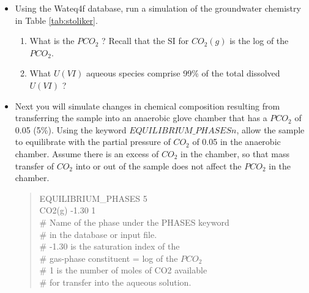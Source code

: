 \begin{itemize}
\item Using the Wateq4f database, run a simulation of the groundwater chemistry in Table \ref{tab:stoliker}.
\begin{enumerate}
\item What is the $PCO_2$ ? Recall that the SI for $CO_2(g)$ is the log of the $PCO_2$.
\item What $U(VI)$ aqueous species comprise 99\% of the total dissolved $U(VI)$ ?
\end{enumerate}

\item Next you will simulate changes in chemical composition resulting from transferring the sample into an anaerobic glove chamber that has a $PCO_2$ of 0.05 (5\%). Using the keyword $EQUILIBRIUM\_PHASES n$, allow the sample to equilibrate with the partial pressure of $CO_2$ of 0.05 in the anaerobic chamber. Assume there is an excess of $CO_2$ in the chamber, so that mass transfer of $CO_2$ into or out of the sample does not affect the $PCO_2$ in the chamber.

\begin{quote}
{\color{red}EQUILIBRIUM\_PHASES 5\\ 
CO2(g)  -1.30   1 \\
\# Name of the phase under the PHASES keyword \\
\# in the database or input file. \\
\# -1.30  is the saturation index of the \\ 
\# gas-phase constituent = log of the $PCO_2$ \\
\# 1 is the number of moles of CO2 available \\
\# for transfer into the aqueous solution. \\}
\end{quote}


\end{itemize}
